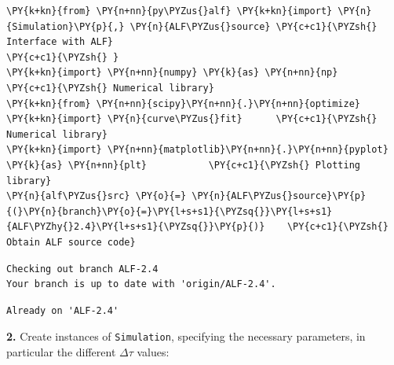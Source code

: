     \begin{tcolorbox}[breakable, size=fbox, boxrule=1pt, pad at break*=1mm,colback=cellbackground, colframe=cellborder]
\begin{Verbatim}[commandchars=\\\{\}]
\PY{k+kn}{from} \PY{n+nn}{py\PYZus{}alf} \PY{k+kn}{import} \PY{n}{Simulation}\PY{p}{,} \PY{n}{ALF\PYZus{}source} \PY{c+c1}{\PYZsh{} Interface with ALF}
\PY{c+c1}{\PYZsh{} }
\PY{k+kn}{import} \PY{n+nn}{numpy} \PY{k}{as} \PY{n+nn}{np}                        \PY{c+c1}{\PYZsh{} Numerical library}
\PY{k+kn}{from} \PY{n+nn}{scipy}\PY{n+nn}{.}\PY{n+nn}{optimize} \PY{k+kn}{import} \PY{n}{curve\PYZus{}fit}      \PY{c+c1}{\PYZsh{} Numerical library}
\PY{k+kn}{import} \PY{n+nn}{matplotlib}\PY{n+nn}{.}\PY{n+nn}{pyplot} \PY{k}{as} \PY{n+nn}{plt}           \PY{c+c1}{\PYZsh{} Plotting library}
\PY{n}{alf\PYZus{}src} \PY{o}{=} \PY{n}{ALF\PYZus{}source}\PY{p}{(}\PY{n}{branch}\PY{o}{=}\PY{l+s+s1}{\PYZsq{}}\PY{l+s+s1}{ALF\PYZhy{}2.4}\PY{l+s+s1}{\PYZsq{}}\PY{p}{)}    \PY{c+c1}{\PYZsh{} Obtain ALF source code}
\end{Verbatim}
\end{tcolorbox}

    \begin{Verbatim}[commandchars=\\\{\}]
Checking out branch ALF-2.4
Your branch is up to date with 'origin/ALF-2.4'.
    \end{Verbatim}

    \begin{Verbatim}[commandchars=\\\{\}]
Already on 'ALF-2.4'
    \end{Verbatim}

    \textbf{2.} Create instances of \texttt{Simulation}, specifying the
necessary parameters, in particular the different \(\Delta \tau\)
values:

